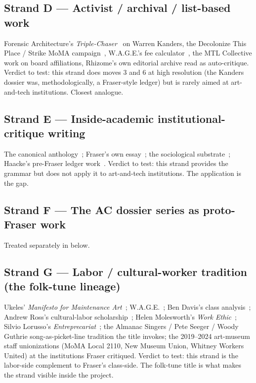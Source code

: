 \documentclass[10pt,letterpaper,twocolumn]{article}
\begin{document}
\subsection{Strand D --- Activist / archival / list-based work}

Forensic Architecture's \emph{Triple-Chaser}~\citep{forensic2019triple} on Warren Kanders, the Decolonize This Place / Strike MoMA campaign~\citep{decolonize2019kanders}, W.A.G.E.'s fee calculator~\citep{wage2024fee}, the MTL Collective work on board affiliations, Rhizome's own editorial archive read as auto-critique. Verdict to test: this strand does moves 3 and 6 at high resolution (the Kanders dossier was, methodologically, a Fraser-style ledger) but is rarely aimed at art-and-tech institutions. Closest analogue.

\subsection{Strand E --- Inside-academic institutional-critique writing}

The canonical anthology~\citep{alberro2009institutional}; Fraser's own essay~\citep{fraser2005critique}; the sociological substrate~\citep{bourdieu1996rules,bourdieu1984distinction,becker1982art}; Haacke's pre-Fraser ledger work~\citep{haacke1971shapolsky}. Verdict to test: this strand provides the grammar but does not apply it to art-and-tech institutions. The application is the gap.

\subsection{Strand F --- The AC dossier series as proto-Fraser work}

Treated separately in  below.

\subsection{Strand G --- Labor / cultural-worker tradition (the folk-tune lineage)}

Ukeles' \emph{Manifesto for Maintenance Art}~\citep{ukeles1969maintenance}; W.A.G.E.~\citep{wage2024fee}; Ben Davis's class analysis~\citep{davis2013theses}; Andrew Ross's cultural-labor scholarship~\citep{ross2009nice,ross2003nocollar}; Helen Molesworth's \emph{Work Ethic}~\citep{molesworth2003work}; Silvio Lorusso's \emph{Entreprecariat}~\citep{lorusso2019entreprecariat}; the Almanac Singers / Pete Seeger / Woody Guthrie song-as-picket-line tradition the title invokes; the 2019--2024 art-museum staff unionizations (MoMA Local 2110, New Museum Union, Whitney Workers United) at the institutions Fraser critiqued. Verdict to test: this strand is the labor-side complement to Fraser's class-side. The folk-tune title is what makes the strand visible inside the project.
\end{document}

